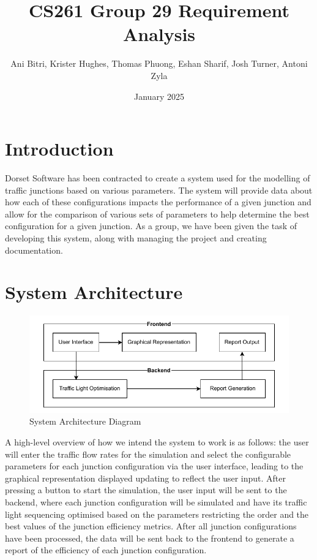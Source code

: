 \documentclass{article}
\title{\vspace{-1.5cm}CS261 Group 29 Requirement Analysis}
\author{Ani Bitri, Krister Hughes, Thomas Phuong, Eshan Sharif, Josh Turner, Antoni Zyla}
\date{January 2025}
\begin{document}
\maketitle


\section{Introduction}
Dorset Software has been contracted to create a system used for the modelling 
of traffic junctions based on various parameters. The system will provide 
data about how each of these configurations impacts the performance of a given 
junction and allow for the comparison of various sets of parameters to help 
determine the best configuration for a given junction. As a group, we have been 
given the task of developing this system, along with managing the project and 
creating documentation.

\section{System Architecture}
\begin{figure}[H]
    \centering
    \includegraphics[width=0.5\linewidth]{System architecture.drawio.pdf}
    \caption{System Architecture Diagram}
    \label{system architecture}
\end{figure}
A high-level overview of how we intend the system to work is as follows: the user will 
enter the traffic flow rates for the simulation and select the configurable parameters 
for each junction configuration via the user interface, leading to the graphical 
representation displayed updating to reflect the user input. After pressing a button to 
start the simulation, the user input will be sent to the backend, where each junction 
configuration will be simulated and have its traffic light sequencing optimised based on 
the parameters restricting the order and the best values of the junction efficiency metrics. 
After all junction configurations have been processed, the data will be sent back to the 
frontend to generate a report of the efficiency of each junction configuration.
\end{document}
